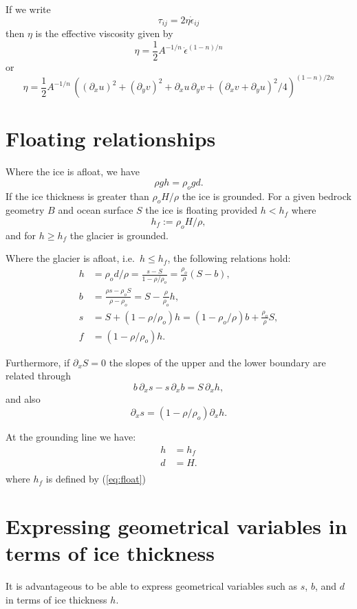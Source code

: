 \documentclass[10pt,a4paper]{book}
\newcommand{\p}{\partial}
\newcommand{\eij}{\dot{\epsilon}_{ij}}
\begin{document}
If we write
\[
\tau_{ij}= 2 \eta \eij
\]
then $\eta$ is the effective viscosity given by
\[
\eta=\frac{1}{2} A^{-1/n} \,\dot{\epsilon}^{(1-n)/n} 
\]
or
\[ 
\eta= \frac{1}{2} A^{-1/n} \, ((\p_{x} u)^2 + (\p_{y} v)^2 + \p_{x} u \,\p_{y} v + (\p_{x} v + \p_{y} u)^2/4)^{(1-n)/2n}
\]

\section{Floating relationships}
Where the ice is afloat, we have
\[  \rho g h = \rho_o g d .\]
If the ice thickness is greater than $\rho_o H/\rho$ the ice is grounded. For a given bedrock geometry $B$ and ocean
surface $S$ the ice is floating provided $h<h_f$ where
\begin{equation}
h_f := \rho_o H /\rho, 
\label{eq:float}
\end{equation}
and for $h \ge h_f$ the glacier is grounded.


Where the glacier is afloat, i.e.\ $h \le h_f$, the following relations hold:
\begin{align} 
h &= \rho_o d /\rho =\frac{s-S}{1-\rho/\rho_o} = \frac{\rho_o}{\rho} (S-b), \label{eq:hs1} \\
b &= \frac{\rho s - \rho_o S}{\rho-\rho_o}  = S-\frac{\rho}{\rho_o} h , \label{eq:bh1}\\
s &= S+(1-\rho/\rho_o) h = (1-\rho_o/\rho) b +\frac{\rho_o}{\rho} S, \label{eq:sb2}\\
f &= (1-\rho/\rho_o) h  . 
\end{align}

Furthermore, if $\p_x S=0$ the slopes of the upper and the lower boundary are related through
\begin{equation}
b \, \p_x s -  s \, \p_x b = S \, \p_x h,
\label{eq:resi}
\end{equation}
and also
\[ \p_x s=(1-\rho/\rho_o) \p_x h .\]

At the grounding line we have:
\begin{align*}
h&=h_f\\
d&=H.\\
\end{align*}
where $h_f$ is defined by (\ref{eq:float})
\section{Expressing geometrical variables in terms of ice thickness}

It is advantageous to be able to express geometrical variables such as $s$, $b$, and $d$ in terms of ice
thickness $h$.  
\end{document}
